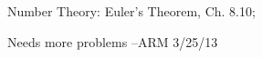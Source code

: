 \documentclass[handout]{mcs}
\begin{document}

\begin{staffnotes}
Number Theory: Euler's Theorem, Ch. 8.10;
\end{staffnotes}

\begin{editingnotes}
Needs more problems --ARM 3/25/13
\end{editingnotes}





\end{document}

